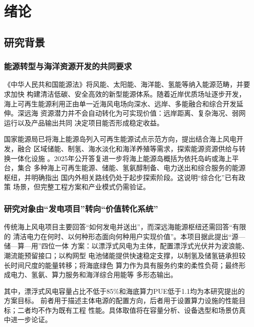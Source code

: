 \chapter{绪论}

\section{研究背景}

\subsection{能源转型与海洋资源开发的共同要求}

《中华人民共和国能源法》将风能、太阳能、海洋能、氢能等纳入能源范畴，并要求加快
构建清洁低碳、安全高效的新型能源体系\cite{energy-law}。随着近岸优质场址逐步开发，
海上可再生能源利用正由单一近海风电场向深水、远岸、多能融合和综合开发延伸。深远海
资源潜力并不会自动转化为可实现价值：远岸距离、复杂海况、弱网运行以及产品输出共同
决定项目能否形成稳定收益。

国家能源局已将海上能源岛列入可再生能源试点示范方向，提出结合海上风电开发，融合
区域储能、制氢、海水淡化和海洋养殖等需求，探索能源资源供给与转换一体化设施
\cite{nea-demo}。2025年公开答复进一步将海上能源岛概括为依托岛屿或海上平台，集合
多种海上可再生能源、储能、氢氨醇制备、电力送出和综合服务的能源枢纽，并明确指出
国内外相关路线仍处于起步探索阶段\cite{nea-energy-island}。这说明“综合化”已有政策
场景，但完整工程方案和产业模式仍需验证。

\subsection{研究对象由“发电项目”转向“价值转化系统”}

传统海上风电项目主要回答“如何发电并送出”，而深远海能源枢纽还需回答“有限的
清洁电力在何时、以何种形态面向何种用户实现价值”。本项目据此提出“源—储—算—用”四位一体
方案：以漂浮式风电为主体，配置漂浮式光伏并为波浪能、潮流能预留接口；以构网型
电池储能提供快速稳定支撑，以制氢及储氢链承担较长时间尺度的能量转移；将海底绿色
算力作为具有服务约束的柔性负荷；最终形成电力、氢氨、算力服务和海洋综合用能等
多形态输出。

其中，漂浮式风电容量占比不低于85\%和海底算力PUE低于1.1均为本研究提出的方案目标。
前者用于描述主体电源的配置方向，后者用于设置算力设施的性能目标；二者均不作为既有工程
性能。具体取值将在容量分析、设备选型和场景仿真中进一步论证。

